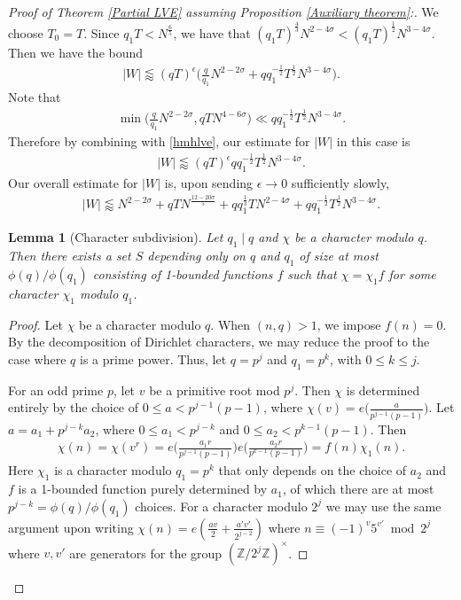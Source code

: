 \documentclass[12pt]{amsart}
\newtheorem{lemma}[theorem]{Lemma}
\theoremstyle{definition}
\theoremstyle{plain}
\theoremstyle{remark}
\numberwithin{equation}{section}
\numberwithin{theorem}{section}
\numberwithin{equation}{section}
\begin{document}
\begin{proof}[Proof of Theorem \ref{Partial LVE} assuming Proposition \ref{Auxiliary theorem}:]
		We choose $T_0=T$. Since $q_1T < N^{\frac{6}{5}}$, we have that $(q_1T)^{\frac{4}{3}}N^{2-4\sigma} < (
		q_1T)^{\frac{1}{2}}N^{3-4\sigma}$. Then we have the bound
		\begin{align*}
			|W| \lessapprox (qT)^{\epsilon}\bigg(\frac{q}{q_1}N^{2-2\sigma}+ q q_1^{-\frac{1}{2}}T^{\frac{1}{2}}N^{3-4\sigma}\bigg).
		\end{align*}
		Note that
		\begin{align*}
			\min\bigg({\frac{q}{q_1}N^{2-2\sigma},qTN^{4-6\sigma}}\bigg) \ll qq_1^{-\frac{1}{2}}T^{\frac{1}{2}}N^{3-4\sigma}.
		\end{align*}
		Therefore by combining with \eqref{hmhlve}, our estimate for $|W|$ in this case is
		\begin{align*}
			|W| \lessapprox (qT)^{\epsilon}q q_1^{-\frac{1}{2}}T^{\frac{1}{2}}N^{3-4\sigma}.
		\end{align*}
		Our overall estimate for $|W|$ is, upon sending $\epsilon \to 0$ sufficiently slowly,
		\begin{align*}
			|W| \lessapprox N^{2-2\sigma}+qTN^{\frac{12-20\sigma}{5}} + qq_1^{\frac{1}{3}}T N^{2-4\sigma}+ q q_1^{-\frac{1}{2}}T^{\frac{1}{2}}N^{3-4\sigma}. \tag*{\qedhere} 
		\end{align*}
		
		\begin{lemma}[Character subdivision]\label{character subdivision}
			Let $q_1 \mid q$ and $\chi$ be a character modulo $q$. Then there exists a set $S$ depending only on $q$ and $q_1$ of size at most $\phi(q)/\phi(q_1)$ consisting of 1-bounded functions $f$ such that $\chi=\chi_1 f$ for some character $\chi_1$ modulo $q_1$.
		\end{lemma}
		\begin{proof}
			Let $\chi$ be a character modulo $q$. When $(n,q)>1$, we impose $f(n)=0$. By the decomposition of Dirichlet characters, we may reduce the proof to the case where \(q\) is a prime
			power. Thus, let $q=p^j$ and $q_1=p^k$, with $0\leq k\leq j$.
			
			For an odd prime $p$, let $v$ be a primitive root mod $p^j$. Then $\chi$ is determined entirely by the choice of $0\leq a < p^{j-1}(p-1)$, where $\chi(v) = e\Big(\frac{a}{p^{j-1}(p-1)}\Big)$. Let $a=a_1+p^{j-k}a_2$, where $0 \leq a_1<p^{j-k}$ and $0\leq a_2<p^{k-1}(p-1)$. Then 
			\begin{align*}
				\chi(n)=\chi(v^r) = e\bigg(\frac{a_1r}{p^{j-1}(p-1)}\bigg)e\bigg({\frac{a_2r}{p^{k-1}(p-1)}}\bigg)=f(n)\chi_1(n).
			\end{align*}
			Here $\chi_1$ is a character modulo $q_1=p^k$ that only depends on the choice of $a_2$ and $f$ is a 1-bounded function purely determined by $a_1$, of which there are at most $p^{j-k} = \phi(q)/\phi(q_1)$ choices. For a character modulo $2^j$ we may use the same argument upon writing $\chi(n) = e\left(\frac{av}{2}+\frac{a'v'}{2^{j-2}}\right)$ where $n \equiv (-1)^{v}5^{v'} \bmod 2^j$ where $v,v'$ are generators for the group $(\mathbb{Z}/2^j\mathbb{Z})^{\times}$.
		\end{proof}
		
	\end{proof}
	
\end{document}
